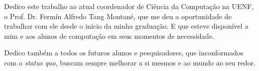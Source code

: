 \begin{dedicatoria}
  \vspace*{\fill}
  \centering
  \noindent


  Dedico este trabalho ao atual coordenador de Ciência da Computação na UENF, o Prof. Dr. Fermín Alfredo Tang Montané, que me deu a oportunidade de trabalhar com ele desde o início da minha graduação. E que esteve disponível a mim e aos alunos de computação em seus momentos de necessidade.

  Dedico também a todos os futuros alunos e pesquisadores, que inconformados com o \textit{status quo}, buscam sempre melhorar a si mesmos e ao mundo ao seu redor.

  \vspace*{\fill}
\end{dedicatoria}